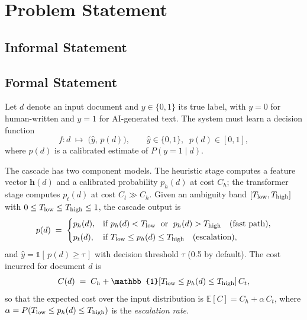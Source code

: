 \section{Problem Statement}

\subsection{Informal Statement}

\begin{center}
\end{center}

\subsection{Formal Statement}

Let $d$ denote an input document and $y \in \{0,1\}$ its true label, with
$y=0$ for human-written and $y=1$ for AI-generated text. The system must learn
a decision function
\begin{equation}
  f : d \;\mapsto\; \big(\hat{y},\, p(d)\big), \qquad \hat{y}\in\{0,1\},\;\; p(d)\in[0,1],
  \label{eq:fdef}
\end{equation}
where $p(d)$ is a calibrated estimate of $P(y=1 \mid d)$.

The cascade has two component models. The heuristic stage computes a feature
vector $\mathbf{h}(d)$ and a calibrated probability $p_h(d)$ at cost $C_h$;
the transformer stage computes $p_t(d)$ at cost $C_t \gg C_h$. Given an
ambiguity band $[T_{\mathrm{low}},T_{\mathrm{high}}]$ with $0 \le T_{\mathrm{low}} \le T_{\mathrm{high}} \le 1$, the
cascade output is
\begin{equation}
  p(d) \;=\;
  \begin{cases}
     p_h(d), & \text{if } p_h(d) < T_{\mathrm{low}} \;\text{ or }\; p_h(d) > T_{\mathrm{high}} \quad\text{(fast path)},\\[2pt]
     p_t(d), & \text{if } T_{\mathrm{low}} \le p_h(d) \le T_{\mathrm{high}} \quad\text{(escalation)},
  \end{cases}
  \label{eq:cascade}
\end{equation}
and $\hat{y} = \mathbb{1}[\,p(d) \ge \tau\,]$ with decision threshold
$\tau$ (0.5 by default). The cost incurred for document $d$ is
\begin{equation}
  C(d) \;=\; C_h + \mathbb{1}\!\left[\Tlow \le p_h(d) \le \Thigh\right] C_t ,
  \label{eq:costd}
\end{equation}
so that the expected cost over the input distribution is
$\mathbb{E}[C] = C_h + \alpha\, C_t$, where
$\alpha = P(T_{\mathrm{low}} \le p_h(d) \le T_{\mathrm{high}})$ is the \emph{escalation rate}.

